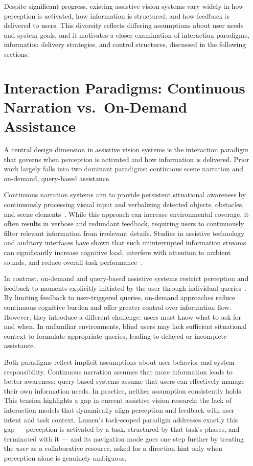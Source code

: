 Despite significant progress, existing assistive vision systems vary widely in how
perception is activated, how information is structured, and how feedback is delivered
to users. This diversity reflects differing assumptions about user needs and system
goals, and it motivates a closer examination of interaction paradigms, information
delivery strategies, and control structures, discussed in the following sections.

\section{Interaction Paradigms: Continuous Narration vs.\ On-Demand Assistance}
\label{sec:interaction_paradigms}

A central design dimension in assistive vision systems is the interaction paradigm
that governs when perception is activated and how information is delivered. Prior
work largely falls into two dominant paradigms: continuous scene narration and
on-demand, query-based assistance.

Continuous narration systems aim to provide persistent situational awareness by
continuously processing visual input and verbalizing detected objects, obstacles, and
scene elements~\cite{li2018vision, fernandes2019review}. While this approach can
increase environmental coverage, it often results in verbose and redundant feedback,
requiring users to continuously filter relevant information from irrelevant details.
Studies in assistive technology and auditory interfaces have shown that such
uninterrupted information streams can significantly increase cognitive load,
interfere with attention to ambient sounds, and reduce overall task
performance~\cite{martinez2014cognitive, hossain2010cognitive}.

In contrast, on-demand and query-based assistive systems restrict perception and
feedback to moments explicitly initiated by the user through individual
queries~\cite{khan2020insight, li2018vision}. By limiting feedback to user-triggered
queries, on-demand approaches reduce continuous cognitive burden and offer greater
control over information flow. However, they introduce a different challenge: users
must know what to ask for and when. In unfamiliar environments, blind users may lack
sufficient situational context to formulate appropriate queries, leading to delayed
or incomplete assistance.

Both paradigms reflect implicit assumptions about user behavior and system
responsibility. Continuous narration assumes that more information leads to better
awareness; query-based systems assume that users can effectively manage their own
information needs. In practice, neither assumption consistently holds. This tension
highlights a gap in current assistive vision research: the lack of interaction models
that dynamically align perception and feedback with user intent and task context.
Lumen's task-scoped paradigm addresses exactly this gap --- perception is activated
by a task, structured by that task's phases, and terminated with it --- and its
navigation mode goes one step further by treating the \emph{user} as a collaborative
resource, asked for a direction hint only when perception alone is genuinely
ambiguous.

